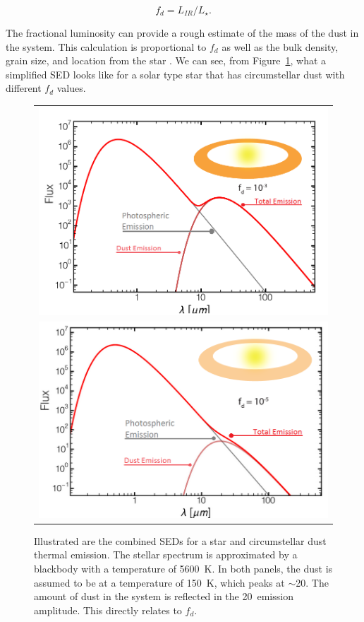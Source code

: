         \begin{equation}\label{eq:fd}
        f_d = L_{IR}/L_{\star}.
        \end{equation}
        
        \noindent The fractional luminosity can provide a rough estimate of the mass of the dust in the system. This calculation is proportional to $f_d$ as well as the bulk density, grain size, and location from the star \citep{Beckwith2000}. We can see, from Figure~\ref{fig:sed_excess_illustration}, what a simplified SED looks like for a solar type star that has circumstellar dust with different $f_d$ values. 
        
    \begin{figure}
    \centering
    \begin{tabular}{c}
    \includegraphics[width=.9\textwidth]{Ch1/sed_1e3} \\
    \includegraphics[width=.83\textwidth]{Ch1/sed_1e5} 
    \end{tabular}
    \caption[SED of generic disk system]{Illustrated are the combined SEDs for a star and circumstellar dust thermal emission. The stellar spectrum is approximated by a blackbody with a temperature of 5600~K. In both panels, the dust is assumed to be at a temperature of 150~K, which peaks at $\sim$20\micron. The amount of dust in the system is reflected in the 20\micron\ emission amplitude. This directly relates to $f_d$.}
    \label{fig:sed_excess_illustration}
    \end{figure}
    
